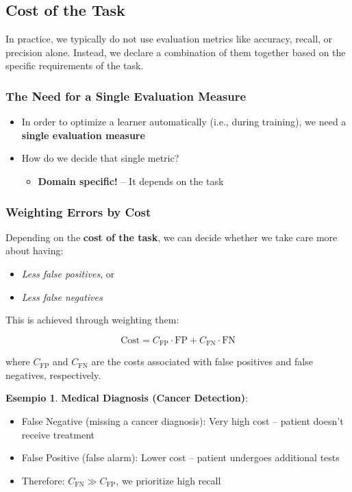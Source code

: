 \documentclass[11pt,a4paper]{article}
\theoremstyle{definition}
\newtheorem{example}{Esempio}[section]
\theoremstyle{plain}
\theoremstyle{remark}
\begin{document}
\subsection{Cost of the Task}

In practice, we typically do not use evaluation metrics like accuracy, recall, or precision alone. Instead, we declare a combination of them together based on the specific requirements of the task.

\subsubsection{The Need for a Single Evaluation Measure}

\begin{itemize}
    \item In order to optimize a learner automatically (i.e., during training), we need a \textbf{single evaluation measure}
    \item How do we decide that single metric?
    \begin{itemize}
        \item \textbf{Domain specific!} – It depends on the task
    \end{itemize}
\end{itemize}

\subsubsection{Weighting Errors by Cost}

Depending on the \textbf{cost of the task}, we can decide whether we take care more about having:
\begin{itemize}
    \item \textit{Less false positives}, or
    \item \textit{Less false negatives}
\end{itemize}

This is achieved through weighting them:

\begin{equation}
\text{Cost} = C_{\text{FP}} \cdot \text{FP} + C_{\text{FN}} \cdot \text{FN}
\end{equation}

where $C_{\text{FP}}$ and $C_{\text{FN}}$ are the costs associated with false positives and false negatives, respectively.

\begin{example}
\textbf{Medical Diagnosis (Cancer Detection)}:
\begin{itemize}
    \item False Negative (missing a cancer diagnosis): Very high cost – patient doesn't receive treatment
    \item False Positive (false alarm): Lower cost – patient undergoes additional tests
    \item Therefore: $C_{\text{FN}} \gg C_{\text{FP}}$, we prioritize high recall
\end{itemize}
\end{example}
\end{document}
